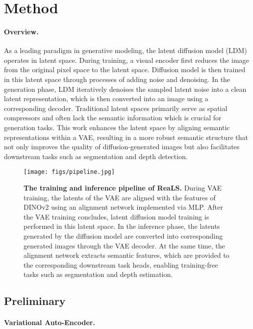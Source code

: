 \section{Method}

\paragraph{Overview.} As a leading paradigm in generative modeling, the latent diffusion model (LDM)~\cite{rombach2022ldm} operates in latent space. During training, a visual encoder first reduces the image from the original pixel space to the latent space. Diffusion model is then trained in this latent space through processes of adding noise and denoising. In the generation phase, LDM iteratively denoises the sampled latent noise into a clean latent representation, which is then converted into an image using a corresponding decoder. Traditional latent spaces primarily serve as spatial compressors and often lack the semantic information which is crucial for generation tasks. This work enhances the latent space by aligning semantic representations within a VAE, resulting in a more robust semantic structure that not only improves the quality of diffusion-generated images but also facilitates downstream tasks such as segmentation and depth detection.

\begin{figure*}
    \centering
    \texttt{[image: figs/pipeline.jpg]}
    \caption{\textbf{The training and inference pipeline of ReaLS.} During VAE training, the latents of the VAE are aligned with the features of DINOv2 using an alignment network implemented via MLP. After the VAE training concludes, latent diffusion model training is performed in this latent space. In the inference phase, the latents generated by the diffusion model are converted into corresponding generated images through the VAE decoder. At the same time, the alignment network extracts semantic features, which are provided to the corresponding downstream task heads, enabling training-free tasks such as segmentation and depth estimation.}
    \label{fig:framework}
    \vspace{-0.5cm}
\end{figure*}

\subsection{Preliminary}
\label{Sec:preliminary}
\paragraph{Variational Auto-Encoder.} 

